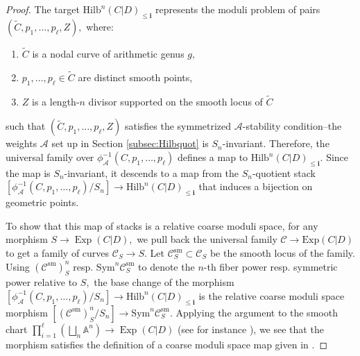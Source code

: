 \documentclass[10.5pt]{amsart}
\theoremstyle{definition}
\theoremstyle{definition}
\theoremstyle{definition}
\theoremstyle{definition}
\newcommand{\Exp}{\operatorname{Exp}}
\newcommand{\Hilb}{\mathrm{Hilb}}
\newcommand{\bi}{\boldsymbol{i}}
\newcommand{\TS}[1]{{\color{pink} #1}}
\begin{document}
\begin{proof}
    The target $\Hilb^n(C|D)_{\leq \bi}$ represents the moduli problem of pairs $(\tilde{C},p_1,\dots,p_\ell, Z),$ where: \begin{enumerate}
        \item  $\tilde{C}$ is a nodal curve of arithmetic genus $g,$
        \item $p_1,\dots,p_\ell\in \tilde{C}$ are distinct smooth points,
        \item $Z$ is a length-$n$ divisor supported on the smooth locus of $\tilde{C}$ \end{enumerate} such that $(\tilde{C}, p_1,\dots,p_\ell, Z)$ satisfies the symmetrized $\mathcal{A}$-stability condition--the weights $\mathcal{A}$ set up in Section \ref{subsec:Hilbquot} is $S_n$-invariant. Therefore, the universal family over $\phi_{\mathcal{A}}^{-1}(C,p_1,\dots,p_\ell)$ defines a map to $\Hilb^n(C|D)_{\leq \bi}.$ Since the map is $S_n$-invariant, it descends to a map from the $S_n$-quotient stack $[\phi_{\mathcal{A}}^{-1}(C,p_1,\dots,p_\ell)/S_n]\to \Hilb^n(C|D)_{\leq \bi}$ that induces a bijection on geometric points.
        

        To show that this map of stacks is a relative coarse moduli space, for any morphism $S\to \Exp(C|D),$ we pull back the universal family $\mathscr{C}\to \mathrm{Exp}(C|D)$ to get a family of curves $\mathscr{C}_S\to S.$ Let $\mathscr{C}_S^{\mathrm{sm}}\subset \mathscr{C}_S$ be the smooth locus of the family. Using $(\mathscr{C}^{\mathrm{sm}})^n_S$ resp. $\mathrm{Sym}^{n}\mathscr{C}^{\mathrm{sm}}_S$ to denote the $n$-th fiber power resp. symmetric power relative to $S,$ the base change of the morphism $[\phi_{\mathcal{A}}^{-1}(C,p_1,\dots,p_\ell)/S_n]\to \Hilb^n(C|D)_{\leq \bi}$ is the relative coarse moduli space morphism $[(\mathscr{C}^{\mathrm{sm}})^n_S/S_n]\to \mathrm{Sym}^{n}\mathscr{C}^{\mathrm{sm}}_S.$ Applying the argument to the smooth chart $\prod_{i=1}^{\ell}(\bigsqcup_{n}\mathbb{A}^n)\to \Exp(C|D)$ (see for instance \cite[§1]{MT16}), we see that the morphism satisfies the definition of a coarse moduli space map given in \cite[Theorem 3.1]{AOV}.

\end{proof}
\end{document}
